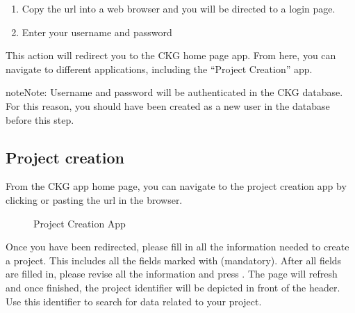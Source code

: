 \documentclass[letterpaper,10pt,english]{sphinxmanual}
\let\sphinxpxdimen\pdfpxdimen\else\newdimen\sphinxpxdimen
\begin{document}

\begin{enumerate}
%
\item {} 
Copy the url  into a web browser and you will be directed to a login page.

\item {} 
Enter your username and password

\end{enumerate}

This action will redirect you to the CKG home page app. From here, you can navigate to different applications, including the “Project Creation” app.

\begin{sphinxadmonition}{note}{Note:}
Username and password will be authenticated in the CKG database. For this reason, you should have been created as a new user in the database before this step.
\end{sphinxadmonition}


\subsection{Project creation}
\label{\detokenize{getting_started/create-new-project:project-creation}}\label{\detokenize{getting_started/create-new-project:id1}}
From the CKG app home page, you can navigate to the project creation app by clicking  or pasting the url  in the browser.
\begin{wrapfigure}{r}{240\sphinxpxdimen}
\centering
\noindent\sphinxincludegraphics[width=240\sphinxpxdimen]{{project_creation_app}.png}
\caption{Project Creation App}\label{\detokenize{getting_started/create-new-project:id2}}\end{wrapfigure}

Once you have been redirected, please fill in all the information needed to create a project. This includes all the fields marked with \sphinxcode{\sphinxupquote{*}} (mandatory). 
After all fields are filled in, please revise all the information and press . 
The page will refresh and once finished, the project identifier will be depicted in front of the  header.  Use this identifier to search for data related to your project.
\end{document}
